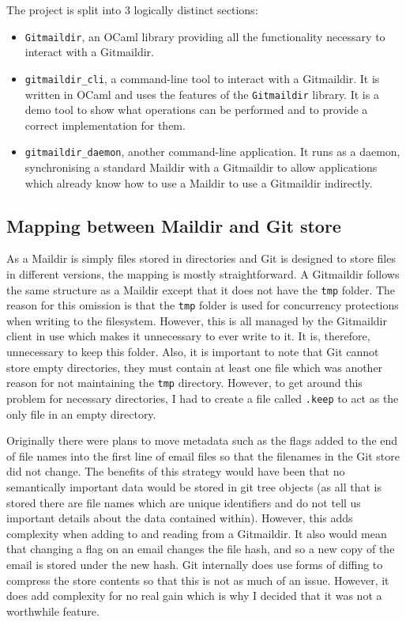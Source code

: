 The project is split into 3 logically distinct sections:
\begin{itemize}
  \item \texttt{Gitmaildir}, an OCaml library providing all the functionality necessary to interact with a Gitmaildir.
  \item \texttt{gitmaildir\_cli}, a command-line tool to interact with a Gitmaildir. It is written in OCaml and uses the features of the \texttt{Gitmaildir} library. It is a demo tool to show what operations can be performed and to provide a correct implementation for them.
  \item \texttt{gitmaildir\_daemon}, another command-line application. It runs as a daemon, synchronising a standard Maildir with a Gitmaildir to allow applications which already know how to use a Maildir to use a Gitmaildir indirectly.
\end{itemize}

\subsection{Mapping between Maildir and Git store} \label{section:mapping}

As a Maildir is simply files stored in directories and Git is designed to store files in different versions, the mapping is mostly straightforward. A Gitmaildir follows the same structure as a Maildir except that it does not have the \texttt{tmp} folder. The reason for this omission is that the \texttt{tmp} folder is used for concurrency protections when writing to the filesystem. However, this is all managed by the Gitmaildir client in use which makes it unnecessary to ever write to it. It is, therefore, unnecessary to keep this folder. Also, it is important to note that Git cannot store empty directories, they must contain at least one file which was another reason for not maintaining the \texttt{tmp} directory. However, to get around this problem for necessary directories, I had to create a file called \texttt{.keep} to act as the only file in an empty directory.

Originally there were plans to move metadata such as the flags added to the end of file names into the first line of email files so that the filenames in the Git store did not change. The benefits of this strategy would have been that no semantically important data would be stored in git tree objects (as all that is stored there are file names which are unique identifiers and do not tell us important details about the data contained within). However, this adds complexity when adding to and reading from a Gitmaildir. It also would mean that changing a flag on an email changes the file hash, and so a new copy of the email is stored under the new hash. Git internally does use forms of diffing to compress the store contents so that this is not as much of an issue. However, it does add complexity for no real gain which is why I decided that it was not a worthwhile feature.

